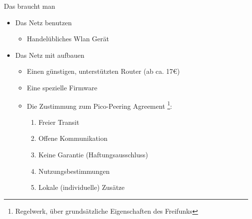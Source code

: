 \begin{frame}{Das braucht man}
    \begin{itemize}
        \item Das Netz benutzen
        \begin{itemize}
            \item Handelübliches Wlan Gerät
        \end{itemize}
        \item Das Netz mit aufbauen
        \begin{itemize}
            \item Einen günstigen, unterstützten Router (ab ca. 17€)
            \item Eine spezielle Firmware
            \item Die Zustimmung zum \glqq{}Pico-Peering Agreement\grqq
                \footnote{Regelwerk, über grundsätzliche Eigenschaften des Freifunks}:
                \begin{enumerate}
                    \item Freier Transit
                    \item Offene Kommunikation
                    \item Keine Garantie (Haftungsausschluss)
                    \item Nutzungsbestimmungen
                    \item Lokale (individuelle) Zusätze
                \end{enumerate}
        \end{itemize}
    \end{itemize}
\end{frame}

